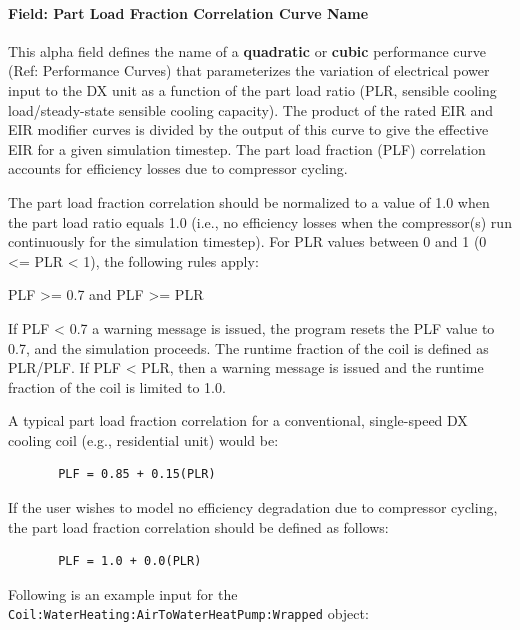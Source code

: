 \paragraph{Field: Part Load Fraction Correlation Curve Name}\label{field-part-load-fraction-correlation-curve-name-9}

This alpha field defines the name of a \textbf{quadratic} or \textbf{cubic} performance curve (Ref: Performance Curves) that parameterizes the variation of electrical power input to the DX unit as a function of the part load ratio (PLR, sensible cooling load/steady-state sensible cooling capacity). The product of the rated EIR and EIR modifier curves is divided by the output of this curve to give the effective EIR for a given simulation timestep. The part load fraction (PLF) correlation accounts for efficiency losses due to compressor cycling.

The part load fraction correlation should be normalized to a value of 1.0 when the part load ratio equals 1.0 (i.e., no efficiency losses when the compressor(s) run continuously for the simulation timestep). For PLR values between 0 and 1 (0 \textless{}= PLR \textless{} 1), the following rules apply:

PLF \textgreater{}= 0.7 and PLF \textgreater{}= PLR

If PLF \textless{} 0.7 a warning message is issued, the program resets the PLF value to 0.7, and the simulation proceeds. The runtime fraction of the coil is defined as PLR/PLF. If PLF \textless{} PLR, then a warning message is issued and the runtime fraction of the coil is limited to 1.0.

A typical part load fraction correlation for a conventional, single-speed DX cooling coil (e.g., residential unit) would be:

\begin{lstlisting}
       PLF = 0.85 + 0.15(PLR)
\end{lstlisting}

If the user wishes to model no efficiency degradation due to compressor cycling, the part load fraction correlation should be defined as follows:

\begin{lstlisting}
       PLF = 1.0 + 0.0(PLR)
\end{lstlisting}

Following is an example input for the \lstinline!Coil:WaterHeating:AirToWaterHeatPump:Wrapped! object:

